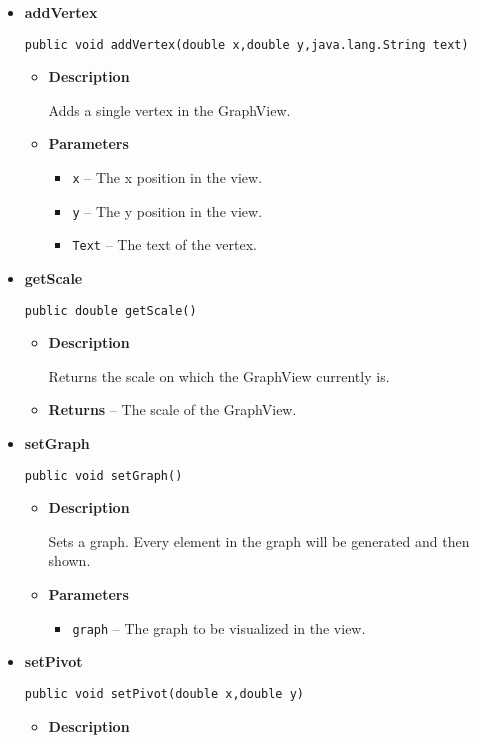 {{{{{{\begin{itemize}
{\begin{itemize}
{Adds a grid to the GraphView, on which the dragging can be mapped.
}
\end{itemize}
}%
\item{ 
{\bf  addVertex}\\
\begin{lstlisting}[frame=none]
public void addVertex(double x,double y,java.lang.String text)\end{lstlisting} %
\begin{itemize}
\item{
{\bf  Description}

Adds a single vertex in the GraphView.
}
\item{
{\bf  Parameters}
  \begin{itemize}
   \item{
\texttt{x} -- The x position in the view.}
   \item{
\texttt{y} -- The y position in the view.}
   \item{
\texttt{Text} -- The text of the vertex.}
  \end{itemize}
}%
\end{itemize}
}%
\item{ 
{\bf  getScale}\\
\begin{lstlisting}[frame=none]
public double getScale()\end{lstlisting} %
\begin{itemize}
\item{
{\bf  Description}

Returns the scale on which the GraphView currently is.
}
\item{{\bf  Returns} -- 
The scale of the GraphView. 
}%
\end{itemize}
}%
\item{ 
{\bf  setGraph}\\
\begin{lstlisting}[frame=none]
public void setGraph()\end{lstlisting} %
\begin{itemize}
\item{
{\bf  Description}

Sets a graph. Every element in the graph will be generated and then shown.
}
\item{
{\bf  Parameters}
  \begin{itemize}
   \item{
\texttt{graph} -- The graph to be visualized in the view.}
  \end{itemize}
}%
\end{itemize}
}%
\item{ 
{\bf  setPivot}\\
\begin{lstlisting}[frame=none]
public void setPivot(double x,double y)\end{lstlisting} %
\begin{itemize}
\item{
{\bf  Description}

}
\end{itemize}}
\end{itemize}}}}}}}
